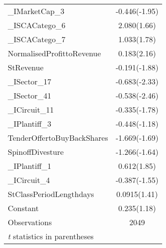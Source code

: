 \begin{table}[H]
\begin{tabular}{l*{1}{c}}
\_IMarketCap\_3       &      -0.446(-1.95)\\
                  
\_ISCACatego\_6       &       2.080(1.66)\\
                    
\_ISCACatego\_7       &       1.033(1.78)\\
                
NormalisedProfittoRevenue&       0.183(2.16)\\
                    
StRevenue           &      -0.191(-1.88)\\
                    
\_ISector\_17         &      -0.683(-2.33)\\
                
\_ISector\_41         &      -0.538(-2.46)\\
                  
\_ICircuit\_11        &      -0.335(-1.78)\\
                  
\_IPlantiff\_3        &      -0.448(-1.18)\\
                    
TenderOffertoBuyBackShares&      -1.669(-1.69)\\
                
SpinoffDivesture    &      -1.266(-1.64)\\                                      
                    
\_IPlantiff\_1        &       0.612(1.85)\\
                    
\_ICircuit\_4         &      -0.387(-1.55)\\
                                      
StClassPeriodLengthdays&      0.0915(1.41)\\
                                                                

Constant            &       0.235(1.18)\\
\hline
Observations        &        2049\\
\hline\hline
\multicolumn{2}{l}{\footnotesize \textit{t} statistics in parentheses}\\
\end{tabular}
\end{table}

